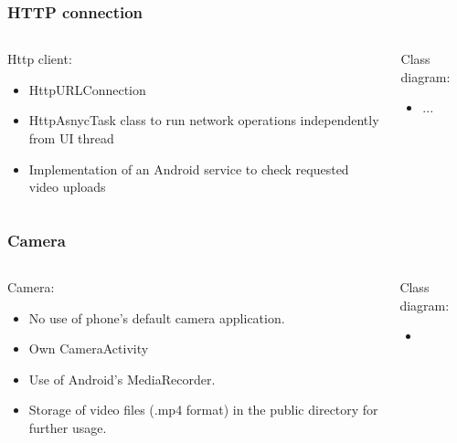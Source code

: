 \begin{frame}	
	\frametitle{HTTP connection}
	\begin{columns}[t]
		\begin{column}[t]{0.5\linewidth}
			Http client:
			\begin{itemize}
				\item HttpURLConnection
				\item HttpAsnycTask class to run network operations independently from UI thread
				\item Implementation of an Android service to check requested video uploads
			\end{itemize}
		\end{column}
		\begin{column}[t]{0.5\linewidth}
			Class diagram:
			\begin{itemize}
				\item ...
			\end{itemize}
			
		\end{column}		
	\end{columns}	
\end{frame}

\begin{frame}	
	\frametitle{Camera}
	\begin{columns}[t]
		\begin{column}[t]{0.5\linewidth}
			Camera:
			\begin{itemize}
				\item No use of phone's default camera application.
				\item Own CameraActivity
				\item Use of Android's MediaRecorder.
				\item Storage of video files (.mp4 format) in the public directory for further usage. 
			\end{itemize}
		\end{column}
		\begin{column}[t]{0.5\linewidth}
			Class diagram:
			\begin{itemize}
				\item 
			\end{itemize}
			
		\end{column}		
	\end{columns}	
\end{frame}

